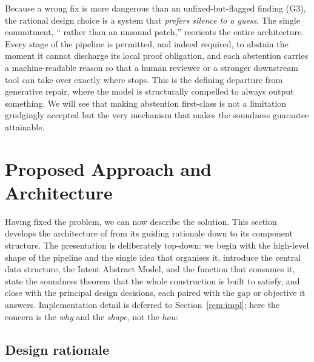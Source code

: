
Because a wrong fix is more dangerous than an unfixed-but-flagged finding
(G3), the rational design choice is a system that \emph{prefers silence to a
guess}. The single commitment, ``\bottom{} rather than an unsound
patch,'' reorients the entire architecture. Every stage of the pipeline is
permitted, and indeed required, to abstain the moment it cannot discharge
its local proof obligation, and each abstention carries a machine-readable
reason so that a human reviewer or a stronger downstream tool can take over
exactly where \irsam{} stops. This is the defining departure from generative
repair, where the model is structurally compelled to always output
something. We will see that making abstention first-class is not a
limitation grudgingly accepted but the very mechanism that makes the
soundness guarantee attainable.


\section{Proposed Approach and Architecture}
\label{rem:design}

Having fixed the problem, we can now describe the solution. This section
develops the architecture of \irsam{} from its guiding rationale down to its
component structure. The presentation is deliberately top-down: we begin
with the high-level shape of the pipeline and the single idea that organises
it, introduce the central data structure, the Intent Abstract Model, and
the function that consumes it, state the soundness theorem that the whole
construction is built to satisfy, and close with the principal design
decisions, each paired with the gap or objective it answers. Implementation
detail is deferred to Section~\ref{rem:impl}; here the concern is the
\emph{why} and the \emph{shape}, not the \emph{how}.

\subsection{Design rationale}
\label{sec:rationale}

